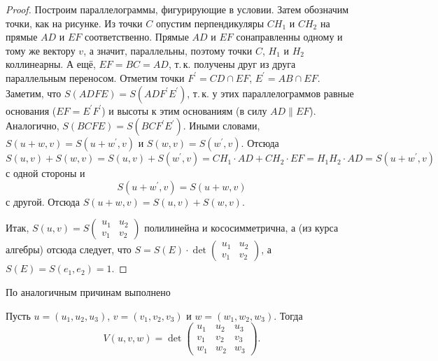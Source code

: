 \begin{proof}
    Построим параллелограммы, фигурирующие в условии. Затем обозначим точки, как на рисунке. Из точки $C$ опустим перпендикуляры $CH_1$ и $CH_2$ на прямые $AD$ и $EF$ соответственно. Прямые $AD$ и $EF$ сонаправленны одному и тому же вектору $v$, а значит, параллельны, поэтому точки $C$, $H_1$ и $H_2$ коллинеарны. А ещё, $EF = BC = AD$, т.\,к. получены друг из друга параллельным переносом. Отметим точки $F^\prime = CD \cap EF$, $E^\prime = AB \cap EF$. Заметим, что $S(ADFE) = S(ADF^\prime E^\prime)$, т.\,к. у этих параллелограммов равные основания ($EF = E^\prime F^\prime$) и высоты к этим основаниям (в силу $AD \parallel EF$). Аналогично, $S(BCFE) = S(BCF^\prime E^\prime)$. Иными словами, $S(u + w, v) = S(u + w^\prime, v)$ и $S(w, v) = S(w^\prime, v)$. Отсюда
    $$S(u, v) + S(w, v) = S(u, v) + S(w^\prime, v) = CH_1 \cdot AD + CH_2 \cdot EF = H_1H_2 \cdot AD = S(u + w^\prime, v)$$
    с одной стороны и
    $$S(u + w^\prime, v) = S(u + w, v)$$
    с другой. Отсюда $S(u + w, v) = S(u, v) + S(w, v)$.

    Итак, $S(u, v) = S
    \begin{pmatrix}
        u_1 & u_2\\
        v_1 & v_2
    \end{pmatrix}$ полилинейна и кососимметрична, а (из курса алгебры) отсюда следует, что $S = S(E) \cdot \det
    \begin{pmatrix}
        u_1 & u_2\\
        v_1 & v_2
    \end{pmatrix}$, а $S(E) = S(e_1, e_2) = 1$.
\end{proof}

По аналогичным причинам выполнено

\begin{statement}
    Пусть $u = (u_1, u_2, u_3)$, $v = (v_1, v_2, v_3)$ и $w = (w_1, w_2, w_3)$. Тогда
    $$
    V(u, v, w) = \det
    \begin{pmatrix}
        u_1 & u_2 & u_3\\
        v_1 & v_2 & v_3\\
        w_1 & w_2 & w_3
    \end{pmatrix}.
    $$
\end{statement}


